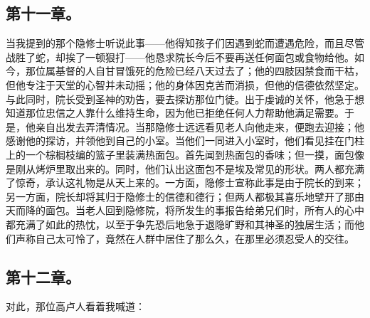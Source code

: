 \subsection{第十一章。}

当我提到的那个隐修士听说此事——他得知孩子们因遇到蛇而遭遇危险，而且尽管战胜了蛇，却挨了一顿狠打——他恳求院长今后不要再送任何面包或食物给他。如今，那位属基督的人自甘冒饿死的危险已经八天过去了；他的四肢因禁食而干枯，但他专注于天堂的心智并未动摇；他的身体因克苦而消损，但他的信德依然坚定。与此同时，院长受到圣神的劝告，要去探访那位门徒。出于虔诚的关怀，他急于想知道那位忠信之人靠什么维持生命，因为他已拒绝任何人力帮助他满足需要。于是，他亲自出发去弄清情况。当那隐修士远远看见老人向他走来，便跑去迎接；他感谢他的探访，并领他到自己的小室。当他们一同进入小室时，他们看见挂在门柱上的一个棕榈枝编的篮子里装满热面包。首先闻到热面包的香味；但一摸，面包像是刚从烤炉里取出来的。同时，他们认出这面包不是埃及常见的形状。两人都充满了惊奇，承认这礼物是从天上来的。一方面，隐修士宣称此事是由于院长的到来；另一方面，院长却将其归于隐修士的信德和德行；但两人都极其喜乐地擘开了那由天而降的面包。当老人回到隐修院，将所发生的事报告给弟兄们时，所有人的心中都充满了如此的热忱，以至于争先恐后地急于退隐旷野和其神圣的独居生活；而他们声称自己太可怜了，竟然在人群中居住了那么久，在那里必须忍受人的交往。\par


\subsection{第十二章。}

\par

对此，那位高卢人看着我喊道：\par

